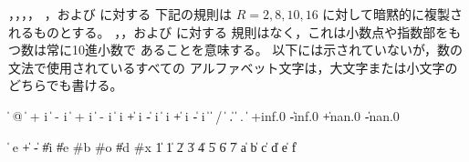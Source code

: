 ，，，，
，および  に対する
下記の規則は \hbox{$R = 2, 8, 10, 16$} に対して暗黙的に複製されるものとする。
，，および  に対する
規則はなく，これは小数点や指数部をもつ数は常に10進小数で
あることを意味する。
以下には示されていないが，数の文法で使用されているすべての
アルファベット文字は，大文字または小文字のどちらでも書ける。
\begin{grammar}%
 \:  
 \: %
   \> \|  @ 
   \> \|  +  i
   \> \|  -  i
   \> \|  + i %
      \|  - i
   \> \|   i 
   \> \| +  i %
      \| -  i
   \> \|  i %
      \| + i %
      \| - i
 \:  
   \> \| 
 \: %
   \> \|  / 
   \> \| 
 \: %
          
   \> \| .  
   \> \|  .  
 \: 
 \: %
          
   \> \|  
 \: +inf.0 \| -inf.0 \| +nan.0
   \> \| -nan.0
\end{grammar}

\begin{grammar}%
 \:  
   \> \|   
 \: e
 \:   \| + \|  -
 \:  \| \#i \| \#e
 \: \#b
 \: \#o
 \:  \| \#d
 \: \#x
  \| 1
  \| 1 \| 2 \| 3 \| 4 \| 5 \| 6 \| 7
 \: 
 \:  \| a \| b \| c \| d \| e \| f %
\end{grammar}


